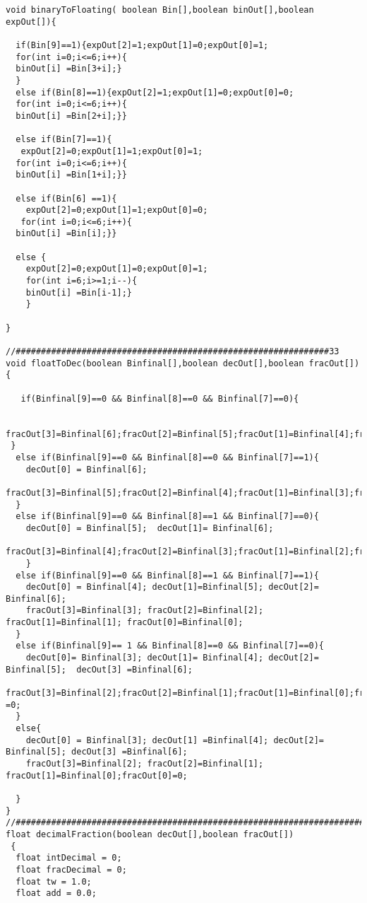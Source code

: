 \documentclass{article}
\begin{document}
\begin{lstlisting}[style=CStyle]
void binaryToFloating( boolean Bin[],boolean binOut[],boolean expOut[]){
    
  if(Bin[9]==1){expOut[2]=1;expOut[1]=0;expOut[0]=1;
  for(int i=0;i<=6;i++){
  binOut[i] =Bin[3+i];}
  }
  else if(Bin[8]==1){expOut[2]=1;expOut[1]=0;expOut[0]=0;
  for(int i=0;i<=6;i++){
  binOut[i] =Bin[2+i];}}
  
  else if(Bin[7]==1){
   expOut[2]=0;expOut[1]=1;expOut[0]=1;
  for(int i=0;i<=6;i++){
  binOut[i] =Bin[1+i];}}
  
  else if(Bin[6] ==1){
    expOut[2]=0;expOut[1]=1;expOut[0]=0;
   for(int i=0;i<=6;i++){
  binOut[i] =Bin[i];}}
  
  else {
    expOut[2]=0;expOut[1]=0;expOut[0]=1;
    for(int i=6;i>=1;i--){
    binOut[i] =Bin[i-1];}
    }
    
}

//##############################################################33
void floatToDec(boolean Binfinal[],boolean decOut[],boolean fracOut[]){
  
   if(Binfinal[9]==0 && Binfinal[8]==0 && Binfinal[7]==0){
   
    fracOut[3]=Binfinal[6];fracOut[2]=Binfinal[5];fracOut[1]=Binfinal[4];fracOut[0]=Binfinal[3];
 }
  else if(Binfinal[9]==0 && Binfinal[8]==0 && Binfinal[7]==1){
    decOut[0] = Binfinal[6];
    fracOut[3]=Binfinal[5];fracOut[2]=Binfinal[4];fracOut[1]=Binfinal[3];fracOut[0]=Binfinal[2];
  }
  else if(Binfinal[9]==0 && Binfinal[8]==1 && Binfinal[7]==0){
    decOut[0] = Binfinal[5];  decOut[1]= Binfinal[6];
    fracOut[3]=Binfinal[4];fracOut[2]=Binfinal[3];fracOut[1]=Binfinal[2];fracOut[0]=Binfinal[1];
    }
  else if(Binfinal[9]==0 && Binfinal[8]==1 && Binfinal[7]==1){
    decOut[0] = Binfinal[4]; decOut[1]=Binfinal[5]; decOut[2]= Binfinal[6];
    fracOut[3]=Binfinal[3]; fracOut[2]=Binfinal[2]; fracOut[1]=Binfinal[1]; fracOut[0]=Binfinal[0];
  }
  else if(Binfinal[9]== 1 && Binfinal[8]==0 && Binfinal[7]==0){
    decOut[0]= Binfinal[3]; decOut[1]= Binfinal[4]; decOut[2]= Binfinal[5];  decOut[3] =Binfinal[6];
    fracOut[3]=Binfinal[2];fracOut[2]=Binfinal[1];fracOut[1]=Binfinal[0];fracOut[0] =0;
  }
  else{
    decOut[0] = Binfinal[3]; decOut[1] =Binfinal[4]; decOut[2]= Binfinal[5]; decOut[3] =Binfinal[6];
    fracOut[3]=Binfinal[2]; fracOut[2]=Binfinal[1]; fracOut[1]=Binfinal[0];fracOut[0]=0;
    
  }
}
//#######################################################################
float decimalFraction(boolean decOut[],boolean fracOut[]) 
 {
  float intDecimal = 0;
  float fracDecimal = 0;
  float tw = 1.0;
  float add = 0.0;


\end{lstlisting}
\end{document}
